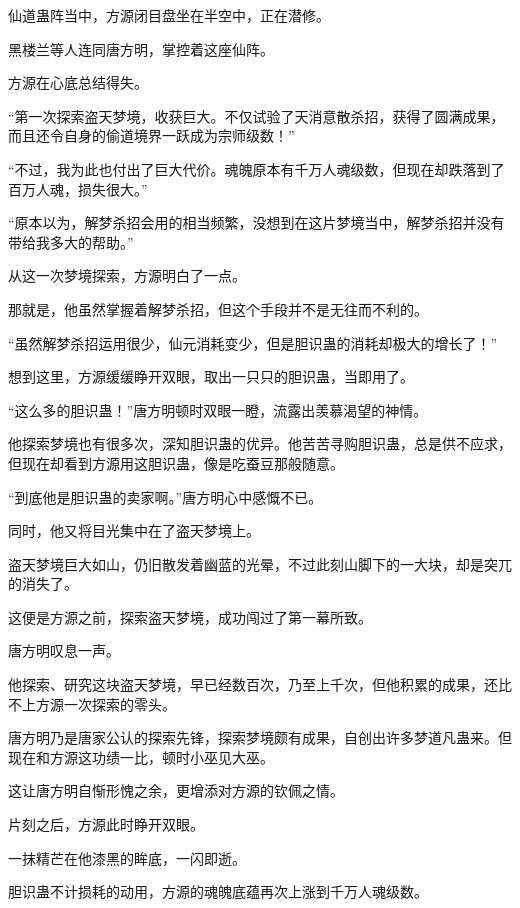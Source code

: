 
\begin{this_body}

仙道蛊阵当中，方源闭目盘坐在半空中，正在潜修。

黑楼兰等人连同唐方明，掌控着这座仙阵。

方源在心底总结得失。

“第一次探索盗天梦境，收获巨大。不仅试验了天消意散杀招，获得了圆满成果，而且还令自身的偷道境界一跃成为宗师级数！”

“不过，我为此也付出了巨大代价。魂魄原本有千万人魂级数，但现在却跌落到了百万人魂，损失很大。”

“原本以为，解梦杀招会用的相当频繁，没想到在这片梦境当中，解梦杀招并没有带给我多大的帮助。”

从这一次梦境探索，方源明白了一点。

那就是，他虽然掌握着解梦杀招，但这个手段并不是无往而不利的。

“虽然解梦杀招运用很少，仙元消耗变少，但是胆识蛊的消耗却极大的增长了！”

想到这里，方源缓缓睁开双眼，取出一只只的胆识蛊，当即用了。

“这么多的胆识蛊！”唐方明顿时双眼一瞪，流露出羡慕渴望的神情。

他探索梦境也有很多次，深知胆识蛊的优异。他苦苦寻购胆识蛊，总是供不应求，但现在却看到方源用这胆识蛊，像是吃蚕豆那般随意。

“到底他是胆识蛊的卖家啊。”唐方明心中感慨不已。

同时，他又将目光集中在了盗天梦境上。

盗天梦境巨大如山，仍旧散发着幽蓝的光晕，不过此刻山脚下的一大块，却是突兀的消失了。

这便是方源之前，探索盗天梦境，成功闯过了第一幕所致。

唐方明叹息一声。

他探索、研究这块盗天梦境，早已经数百次，乃至上千次，但他积累的成果，还比不上方源一次探索的零头。

唐方明乃是唐家公认的探索先锋，探索梦境颇有成果，自创出许多梦道凡蛊来。但现在和方源这功绩一比，顿时小巫见大巫。

这让唐方明自惭形愧之余，更增添对方源的钦佩之情。

片刻之后，方源此时睁开双眼。

一抹精芒在他漆黑的眸底，一闪即逝。

胆识蛊不计损耗的动用，方源的魂魄底蕴再次上涨到千万人魂级数。


\end{this_body}
